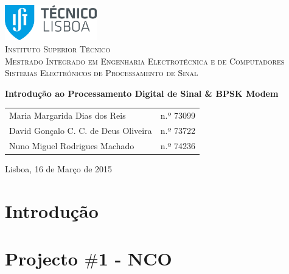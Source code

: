 \documentclass[11pt]{article}
\numberwithin{equation}{section}
\begin{document}
\begin{titlepage}
\begin{center}

\hfill \break
\hfill \break

\includegraphics[width=0.3\textwidth]{./logo}~\\[1cm]

\textsc{\LARGE Instituto Superior Técnico}\\[0.25cm]
\textsc{\Large Mestrado Integrado em Engenharia Electrotécnica e de Computadores}\\[1.8cm]
\textsc{\huge Sistemas Electrónicos de Processamento de Sinal}\\[0.25cm]

\vspace{6mm}

{\huge \bfseries Introdução ao Processamento Digital de Sinal \& \linebreak BPSK Modem \\[1cm]}

\begin{tabular}{ l l }
Maria Margarida Dias dos Reis & \hspace{2mm} n.º 73099 \\
David Gonçalo C. C. de Deus Oliveira & \hspace{2mm} n.º 73722 \\
Nuno Miguel Rodrigues Machado & \hspace{2mm} n.º 74236

\end{tabular}

\vfill

{\large Lisboa, 16 de Março de 2015} 

\end{center}
\end{titlepage}

\clearpage

\tableofcontents
\pagebreak

\clearpage
{}

\section{Introdução}

\section{Projecto $\#$1 - NCO}
\end{document}
